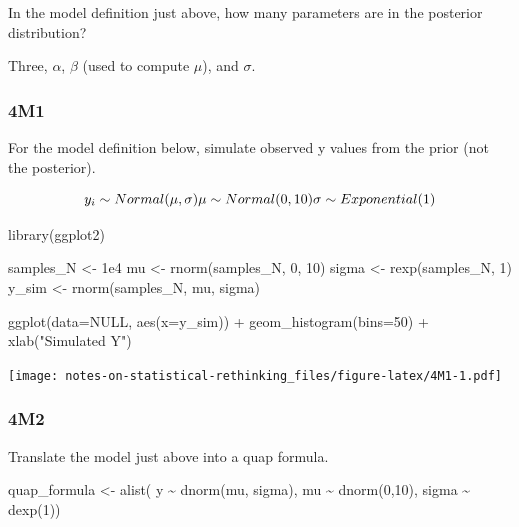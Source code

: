 \documentclass[
]{book}
\newenvironment{Shaded}{\begin{snugshade}}{\end{snugshade}}
\newcommand{\AttributeTok}[1]{\textcolor[rgb]{0.77,0.63,0.00}{#1}}
\newcommand{\ConstantTok}[1]{\textcolor[rgb]{0.00,0.00,0.00}{#1}}
\newcommand{\DecValTok}[1]{\textcolor[rgb]{0.00,0.00,0.81}{#1}}
\newcommand{\FloatTok}[1]{\textcolor[rgb]{0.00,0.00,0.81}{#1}}
\newcommand{\FunctionTok}[1]{\textcolor[rgb]{0.00,0.00,0.00}{#1}}
\newcommand{\NormalTok}[1]{#1}
\newcommand{\OtherTok}[1]{\textcolor[rgb]{0.56,0.35,0.01}{#1}}
\newcommand{\SpecialCharTok}[1]{\textcolor[rgb]{0.00,0.00,0.00}{#1}}
\newcommand{\StringTok}[1]{\textcolor[rgb]{0.31,0.60,0.02}{#1}}
\begin{document}
In the model definition just above, how many parameters are in the posterior distribution?

Three, \(α\), \(β\) (used to compute \(\mu\)), and \(\sigma\).

\hypertarget{m1-2}{%
\subsubsection*{4M1}\label{m1-2}}

For the model definition below, simulate observed y values from the prior (not the posterior).

\[y_i \sim Normal(\mu,\sigma) \\
\mu \sim Normal(0, 10) \\
\sigma \sim Exponential(1)\]

\begin{Shaded}
\begin{Highlighting}[]
\FunctionTok{library}\NormalTok{(ggplot2)}

\NormalTok{samples\_N }\OtherTok{\textless{}{-}} \FloatTok{1e4}
\NormalTok{mu }\OtherTok{\textless{}{-}} \FunctionTok{rnorm}\NormalTok{(samples\_N, }\DecValTok{0}\NormalTok{, }\DecValTok{10}\NormalTok{)}
\NormalTok{sigma }\OtherTok{\textless{}{-}} \FunctionTok{rexp}\NormalTok{(samples\_N, }\DecValTok{1}\NormalTok{)}
\NormalTok{y\_sim }\OtherTok{\textless{}{-}} \FunctionTok{rnorm}\NormalTok{(samples\_N, mu, sigma)}

\FunctionTok{ggplot}\NormalTok{(}\AttributeTok{data=}\ConstantTok{NULL}\NormalTok{, }\FunctionTok{aes}\NormalTok{(}\AttributeTok{x=}\NormalTok{y\_sim)) }\SpecialCharTok{+} 
  \FunctionTok{geom\_histogram}\NormalTok{(}\AttributeTok{bins=}\DecValTok{50}\NormalTok{) }\SpecialCharTok{+} 
  \FunctionTok{xlab}\NormalTok{(}\StringTok{"Simulated Y"}\NormalTok{)}
\end{Highlighting}
\end{Shaded}

\texttt{[image: notes-on-statistical-rethinking\_files/figure-latex/4M1-1.pdf]}

\hypertarget{m2-2}{%
\subsubsection*{4M2}\label{m2-2}}

Translate the model just above into a quap formula.

\begin{Shaded}
\begin{Highlighting}[]
\NormalTok{quap\_formula }\OtherTok{\textless{}{-}} \FunctionTok{alist}\NormalTok{(}
\NormalTok{  y }\SpecialCharTok{\textasciitilde{}} \FunctionTok{dnorm}\NormalTok{(mu, sigma),}
\NormalTok{  mu }\SpecialCharTok{\textasciitilde{}} \FunctionTok{dnorm}\NormalTok{(}\DecValTok{0}\NormalTok{,}\DecValTok{10}\NormalTok{),}
\NormalTok{  sigma }\SpecialCharTok{\textasciitilde{}} \FunctionTok{dexp}\NormalTok{(}\DecValTok{1}\NormalTok{))}
\end{Highlighting}
\end{Shaded}
\end{document}

